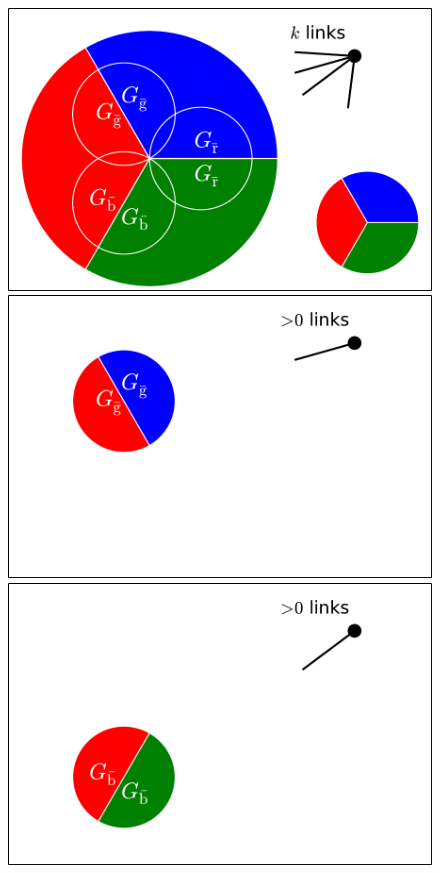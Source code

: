 \documentclass[aps, pre, onecolumn, a4paper, floatfix]{revtex4}
\begin{document}
\begin{figure}[htb]
  \begin{minipage}[b]{0.35\linewidth}
    \begin{center}
    \includegraphics[width=0.99\columnwidth]{sets_k_all.pdf}\\
     \vspace{7mm}
    \includegraphics[width=0.99\columnwidth]{sets_k_gc_no_2.pdf}\\
    \includegraphics[trim=0 0 0 190,clip,width=0.99\columnwidth]{sets_k_gc_no_3.pdf}\\

\end{center}
\end{minipage}
\end{figure}
\end{document}
